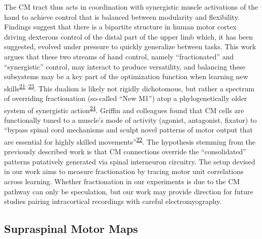 \documentclass[
  a4paper,
]{article}
\begin{document}
The CM tract thus acts in coordination with synergistic muscle
activations of the hand to achieve control that is balanced between
modularity and flexibility. Findings suggest that there is a bipartite
structure in human motor cortex driving dexterous control of the distal
part of the upper limb which, it has been suggested, evolved under
pressure to quickly generalize between tasks. This work argues that
these two streams of hand control, namely ``fractionated'' and
``synergistic'' control, may interact to produce versatility, and
balancing these subsystems may be a key part of the optimization
function when learning new
skills\textsuperscript{\protect\hyperlink{ref-Rathelot2009}{21}--\protect\hyperlink{ref-Takei2017}{23}}.
This dualism is likely not rigidly dichotomous, but rather a spectrum of
overriding fractionation (so-called ``New M1'') atop a phylogenetically
older system of synergistic
action\textsuperscript{\protect\hyperlink{ref-dumCorticospinalSystemStructural2011}{24}}.
Griffin and colleagues found that CM cells are functionally tuned to a
muscle's mode of activity (agonist, antagonist, fixator) to ``bypass
spinal cord mechanisms and sculpt novel patterns of motor output that
are essential for highly skilled
movements''\textsuperscript{\protect\hyperlink{ref-griffinCorticomotoneuronalCellsAre2015}{22}}.
The hypothesis stemming from the previously described work is that CM
connections override the ``consolidated'' patterns putatively generated
via spinal interneuron circuitry. The setup devised in our work aims to
measure fractionation by tracing motor unit correlations across
learning. Whether fractionation in our experiments is due to the CM
pathway can only be speculation, but our work may provide direction for
future studies pairing intracortical recordings with careful
electromyography.

\hypertarget{supraspinal-motor-maps}{%
\subsection{Supraspinal Motor Maps}\label{supraspinal-motor-maps}}
\end{document}
